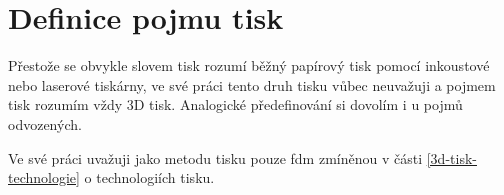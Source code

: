 \section{Definice pojmu tisk}\label{3d-tisk-definice-pojmu}

Přestože se obvykle slovem tisk rozumí běžný papírový tisk pomocí inkoustové nebo laserové tiskárny,
ve své práci tento druh tisku vůbec neuvažuji a pojmem tisk rozumím vždy 3D tisk.
Analogické předefinování si dovolím i u pojmů odvozených.

Ve své práci uvažuji jako metodu tisku pouze \acrshort{fdm} zmíněnou v části \ref{3d-tisk-technologie} o technologiích tisku.
